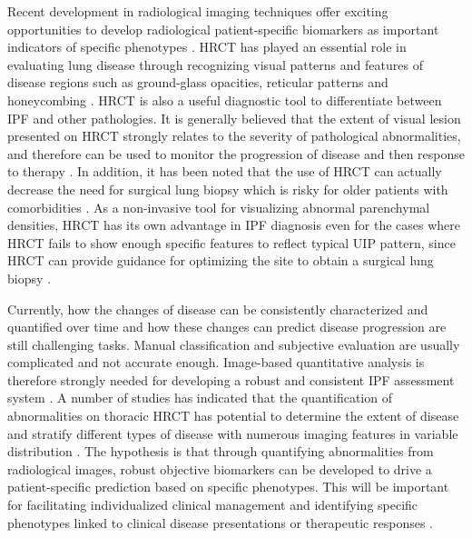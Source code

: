 Recent development in radiological imaging techniques offer exciting opportunities to develop radiological patient-specific biomarkers as important indicators of specific phenotypes \citep{devaraj2014imaging,gotway2007challenges}. HRCT has played an essential role in evaluating lung disease through recognizing visual patterns and features of disease regions such as ground-glass opacities, reticular patterns and honeycombing \citep{mueller2007every}. HRCT is also a useful diagnostic tool to differentiate between IPF and other pathologies. It is generally believed that the extent of visual lesion presented on HRCT strongly relates to the severity of pathological abnormalities, and therefore can be used to monitor the progression of disease and then response to therapy \citep{kazerooni1997thin,kim1999nonspecific,wells2003idiopathic,saketkoo2011developing}. In addition, it has been noted that the use of HRCT can actually decrease the need for surgical lung biopsy which is risky for older patients with comorbidities \citep{bartholmai2013quantitative}. As a non-invasive tool for visualizing abnormal parenchymal densities, HRCT has its own advantage in IPF diagnosis even for the cases where HRCT fails to show enough specific features to reflect typical UIP pattern, since HRCT can provide guidance for optimizing the site to obtain a surgical lung biopsy \citep{kazerooni2001high, diette2005high, misumi2006idiopathic, costabel2007diffuse}. 

Currently, how the changes of disease can be consistently characterized and quantified over time and how these changes can predict disease progression are still challenging tasks. Manual classification and subjective evaluation are usually complicated and not accurate enough. Image-based quantitative analysis is therefore strongly needed for developing a robust and consistent IPF assessment system \citep{gotway2007challenges,lynch2005high}. A number of studies has indicated that the quantification of abnormalities on thoracic HRCT has potential to determine the extent of disease and stratify different types of disease with numerous imaging features in variable distribution \citep{best2008idiopathic,wells2003idiopathic, sumikawa2008computed, bartholmai2013quantitative}. The hypothesis is that through quantifying abnormalities from radiological images, robust objective biomarkers can be developed to drive a patient-specific prediction based on specific phenotypes. This will be important for facilitating individualized clinical management and identifying specific phenotypes linked to clinical disease presentations or therapeutic responses \citep{raghunath2014quantitative}.
\newpage

